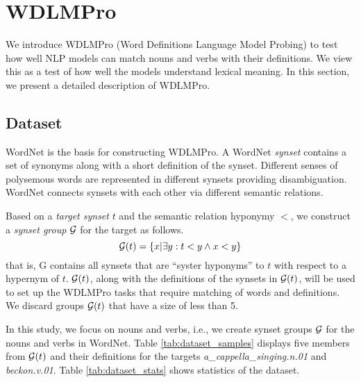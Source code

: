 \documentclass[11pt,a4paper]{article}
\begin{document}
\section{WDLMPro}
We introduce  WDLMPro (Word Definitions Language Model
Probing) to test how well NLP models can match
nouns and verbs with  their
definitions.
We view this as a test of how well the models understand lexical meaning.
In this section, we
present a detailed description of WDLMPro.

\subsection{Dataset}
WordNet \cite{miller95wordnet} is the basis for
constructing WDLMPro.  A WordNet \textit{synset} contains a
set of synonyms along with a short definition of
the synset.  Different senses of polysemous words are
represented in different synsets providing
disambiguation. WordNet connects synsets with each other via
different semantic relations.

Based on a \emph{target synset}
$t$ and the semantic relation hyponymy $<$, we construct
a \emph{synset group} $\cal G$ for the target as follows.
\[
  {\cal G}(t) = \{ x | \exists y: t<y \wedge x<y \}
  \]
that is, {\cal G} contains all synsets that are ``syster
hyponyms'' to $t$ with respect to a hypernym of $t$.
${\cal G}(t)$, along with the definitions of the synsets in
${\cal G}(t)$,
will be used to
set up the WDLMPro tasks that require matching of words and definitions.
We discard groups ${\cal G}(t)$ that
have a size of less than 5.


In this study, we focus on nouns and verbs, i.e., we create
synset groups ${\cal G}$ for the nouns and verbs in WordNet.
Table
\ref{tab:dataset_samples} displays five members from ${\cal
  G} (t)$ 
and their definitions
for the targets
\emph{a\_cappella\_singing.n.01} and
\emph{beckon.v.01}. 
Table \ref{tab:dataset_stats} shows statistics of the dataset.


  
\end{document}
